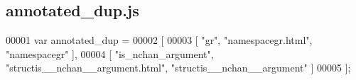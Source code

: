 \subsection{annotated\+\_\+dup.\+js}
\label{annotated__dup_8js_source}

\begin{DoxyCode}
00001 var annotated_dup =
00002 [
00003     [ \textcolor{stringliteral}{"gr"}, \textcolor{stringliteral}{"namespacegr.html"}, \textcolor{stringliteral}{"namespacegr"} ],
00004     [ \textcolor{stringliteral}{"is\_nchan\_argument"}, \textcolor{stringliteral}{"structis\_\_nchan\_\_argument.html"}, \textcolor{stringliteral}{"structis\_\_nchan\_\_argument"} ]
00005 ];
\end{DoxyCode}

